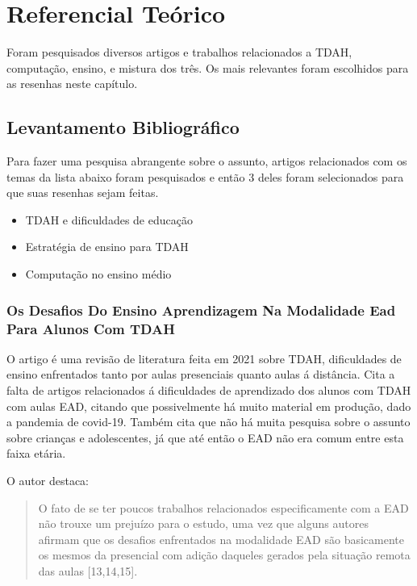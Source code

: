 \chapter{Referencial Teórico}

Foram pesquisados diversos artigos e trabalhos relacionados a TDAH, computação, ensino, e mistura dos três. Os mais relevantes foram escolhidos para as resenhas neste capítulo.


\section{Levantamento Bibliográfico}

Para fazer uma pesquisa abrangente sobre o assunto, artigos relacionados com os temas da lista abaixo foram pesquisados e então 3 deles foram selecionados para que suas resenhas sejam feitas.

\begin{itemize}
    \item TDAH e dificuldades de educação
	\item Estratégia de ensino para TDAH
    \item Computação no ensino médio
\end{itemize}

\subsection{Os Desafios Do Ensino Aprendizagem Na Modalidade Ead Para Alunos Com TDAH}

O artigo\cite{okuyama} é uma revisão de literatura feita em 2021 sobre TDAH, dificuldades de ensino enfrentados tanto por aulas presenciais quanto aulas á distância. Cita a falta de artigos relacionados á dificuldades de aprendizado dos alunos com TDAH com aulas EAD, citando que possivelmente há muito material em produção, dado a pandemia de covid-19. Também cita que não há muita pesquisa sobre o assunto sobre crianças e adolescentes, já que até então o EAD não era comum entre esta faixa etária. 

O autor destaca:

\begin{quote}
O fato de se ter poucos trabalhos relacionados especificamente com a EAD não trouxe um prejuízo para o estudo, uma vez que alguns autores afirmam que os desafios enfrentados na modalidade EAD são basicamente os mesmos da presencial com adição daqueles gerados pela situação remota das aulas [13,14,15].
\end{quote}

